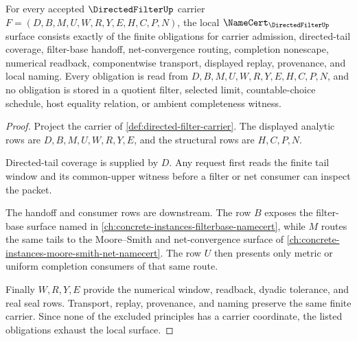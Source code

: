 \begin{theorem}\label{thm:directed-filter-namecert-obligations}
For every accepted $\DirectedFilterUp$ carrier $F=(D,B,M,U,W,R,Y,E,H,C,P,N)$, the local $\NameCert_{\DirectedFilterUp}$ surface consists exactly of the finite obligations for carrier admission, directed-tail coverage, filter-base handoff, net-convergence routing, completion nonescape, numerical readback, componentwise transport, displayed replay, provenance, and local naming. Every obligation is read from $D,B,M,U,W,R,Y,E,H,C,P,N$, and no obligation is stored in a quotient filter, selected limit, countable-choice schedule, host equality relation, or ambient completeness witness.
\end{theorem}
\begin{proof}
Project the carrier of \autoref{def:directed-filter-carrier}. The displayed analytic rows are $D,B,M,U,W,R,Y,E$, and the structural rows are $H,C,P,N$.

Directed-tail coverage is supplied by $D$. Any request first reads the finite tail window and its common-upper witness before a filter or net consumer can inspect the packet.

The handoff and consumer rows are downstream. The row $B$ exposes the filter-base surface named in \autoref{ch:concrete-instances-filterbase-namecert}, while $M$ routes the same tails to the Moore--Smith and net-convergence surface of \autoref{ch:concrete-instances-moore-smith-net-namecert}. The row $U$ then presents only metric or uniform completion consumers of that same route.

Finally $W,R,Y,E$ provide the numerical window, readback, dyadic tolerance, and real seal rows. Transport, replay, provenance, and naming preserve the same finite carrier. Since none of the excluded principles has a carrier coordinate, the listed obligations exhaust the local surface.
\end{proof}

